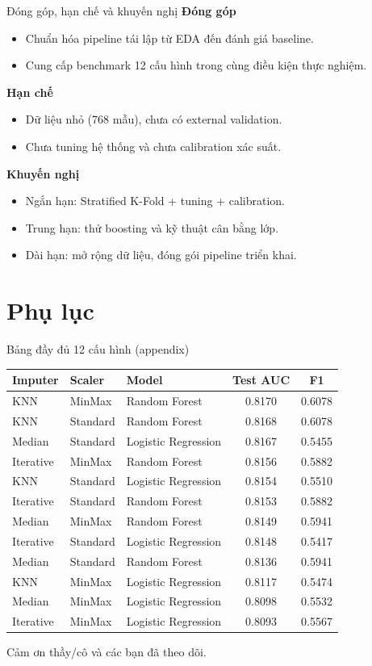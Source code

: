 \documentclass[10pt]{beamer}
\begin{document}
\begin{frame}{Đóng góp, hạn chế và khuyến nghị}
  \textbf{Đóng góp}
  \begin{itemize}
    \item Chuẩn hóa pipeline tái lập từ EDA đến đánh giá baseline.
    \item Cung cấp benchmark 12 cấu hình trong cùng điều kiện thực nghiệm.
  \end{itemize}
  \textbf{Hạn chế}
  \begin{itemize}
    \item Dữ liệu nhỏ (768 mẫu), chưa có external validation.
    \item Chưa tuning hệ thống và chưa calibration xác suất.
  \end{itemize}
  \textbf{Khuyến nghị}
  \begin{itemize}
    \item Ngắn hạn: Stratified K-Fold + tuning + calibration.
    \item Trung hạn: thử boosting và kỹ thuật cân bằng lớp.
    \item Dài hạn: mở rộng dữ liệu, đóng gói pipeline triển khai.
  \end{itemize}
\end{frame}

\appendix
\section{Phụ lục}

\begin{frame}{Bảng đầy đủ 12 cấu hình (appendix)}
  \tiny
  \begin{tabular}{lllcc}
    \toprule
    Imputer & Scaler & Model & Test AUC & F1\\
    \midrule
    KNN & MinMax & Random Forest & 0.8170 & 0.6078\\
    KNN & Standard & Random Forest & 0.8168 & 0.6078\\
    Median & Standard & Logistic Regression & 0.8167 & 0.5455\\
    Iterative & MinMax & Random Forest & 0.8156 & 0.5882\\
    KNN & Standard & Logistic Regression & 0.8154 & 0.5510\\
    Iterative & Standard & Random Forest & 0.8153 & 0.5882\\
    Median & MinMax & Random Forest & 0.8149 & 0.5941\\
    Iterative & Standard & Logistic Regression & 0.8148 & 0.5417\\
    Median & Standard & Random Forest & 0.8136 & 0.5941\\
    KNN & MinMax & Logistic Regression & 0.8117 & 0.5474\\
    Median & MinMax & Logistic Regression & 0.8098 & 0.5532\\
    Iterative & MinMax & Logistic Regression & 0.8093 & 0.5567\\
    \bottomrule
  \end{tabular}
\end{frame}

\begin{frame}[standout]
  Cảm ơn thầy/cô và các bạn đã theo dõi.
\end{frame}
\end{document}
